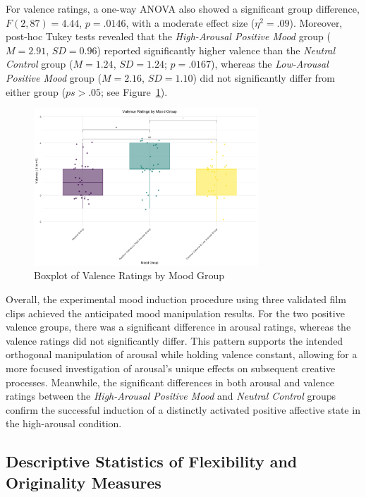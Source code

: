 \documentclass[../MA_Thesis.tex]{subfiles}
\begin{document}
For valence ratings, a one-way ANOVA also showed a significant group difference, $F(2, 87) = 4.44$, $p = .0146$, with a moderate effect size ($\eta^2 = .09$). Moreover, post-hoc Tukey tests revealed that the \textit{High-Arousal Positive Mood} group ($M = 2.91$, $SD = 0.96$) reported significantly higher valence than the \textit{Neutral Control} group ($M = 1.24$, $SD = 1.24$; $p = .0167$), whereas the \textit{Low-Arousal Positive Mood} group ($M = 2.16$, $SD = 1.10$) did not significantly differ from either group ($ps > .05$; see Figure~\ref{fig:valence_group}). 

\begin{figure}[H]
  \centering
  \includegraphics[width=0.75\textwidth]{../analysis/results/main_results/mood_induction_check/valence_by_group.png}
  \caption{Boxplot of Valence Ratings by Mood Group}
  \label{fig:valence_group}
\end{figure}

Overall, the experimental mood induction procedure using three validated film clips achieved the anticipated mood manipulation results. For the two positive valence groups, there was a significant difference in arousal ratings, whereas the valence ratings did not significantly differ. This pattern supports the intended orthogonal manipulation of arousal while holding valence constant, allowing for a more focused investigation of arousal's unique effects on subsequent creative processes. Meanwhile, the significant differences in both arousal and valence ratings between the \textit{High-Arousal Positive Mood} and \textit{Neutral Control} groups confirm the successful induction of a distinctly activated positive affective state in the high-arousal condition.

\subsection*{Descriptive Statistics of Flexibility and Originality Measures}
\end{document}
